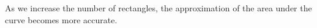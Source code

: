 \documentclass[preview]{standalone}
\begin{document}
\begin{center}
As we increase the number of rectangles, the approximation of the area under the curve becomes more accurate.
\end{center}
\end{document}
